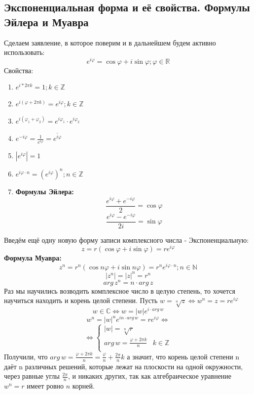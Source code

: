 \documentclass[twoside]{book}
\begin{document}
\subsection{Экспоненциальная форма и её свойства. Формулы Эйлера и Муавра}

Сделаем заявление, в которое поверим и в дальнейшем будем активно использовать:
$$e^{i\varphi}=\cos{\varphi} + i\sin{\varphi}; \varphi\in\mathbb{R}$$
Свойства:
\begin{enumerate}
    \item $e^{i*2\pi k} = 1; k\in\mathbb{Z}$
    \item $e^{i(\varphi + 2\pi k)} = e^{i\varphi}; k\in\mathbb{Z}$
    \item $e^{i(\varphi_1 + \varphi_2)} = e^{i\varphi_1} \cdot e^{i\varphi_2}$
    \item $e^{-i\varphi} = \frac{1}{e^{i\varphi}} = \overline{e^{i\varphi}}$
    \item $|e^{i\varphi}| = 1$
    \item $e^{i\varphi \cdot n} = (e^{i\varphi})^n; n\in\mathbb{Z}$
    \item \textbf{Формулы Эйлера:}
          $$\frac{e^{i\varphi}+e^{-i\varphi}}{2}=\cos{\varphi}$$
          $$\frac{e^{i\varphi}-e^{-i\varphi}}{2i}=\sin{\varphi}$$
\end{enumerate}

Введём ещё одну новую форму записи комплексного числа - Экспоненциальную:
$$z=r(\cos{\varphi}+i\sin{\varphi})=re^{i\varphi}$$
\textbf{Формула Муавра:}
$$z^n=r^n(\cos{n\varphi} + i\sin{n\varphi})=r^ne^{i\varphi \cdot n}; n\in\mathbb{N}$$
$$|z^n|=|z|^n=r^n$$
$$arg\,z^n=n \cdot arg\,z$$
Раз мы научились возводить комплексное число в целую степень, то хочется научиться находить и корень целой степени. Пусть $w=\sqrt[n]{z} \Leftrightarrow w^n=z=re^{i\varphi}$
$$w\in\mathbb{C}\Leftrightarrow w=|w|e^{i \cdot arg\,w}$$
$$w^n=|w|^ne^{in \cdot arg\,w}=re^{i\varphi} \Leftrightarrow$$
$$\Leftrightarrow
    \begin{cases}
        |w|=\sqrt[n]{r}                                  \\
        arg\,w=\frac{\varphi+2\pi k}{n} & k\in\mathbb{Z} \\
    \end{cases}
$$
Получили, что $arg\,w=\frac{\varphi+2\pi k}{n}=\frac{\varphi}{n} + \frac{2\pi}{n}k$ а значит, что корень целой степени n даёт n различных решений, которые лежат на плоскости на одной окружности, через равные углы $\frac{2\pi}{n}$, и никаких других, так как алгебраическое уравнение $ w^n = r $ имеет ровно $n$ корней.
\end{document}
